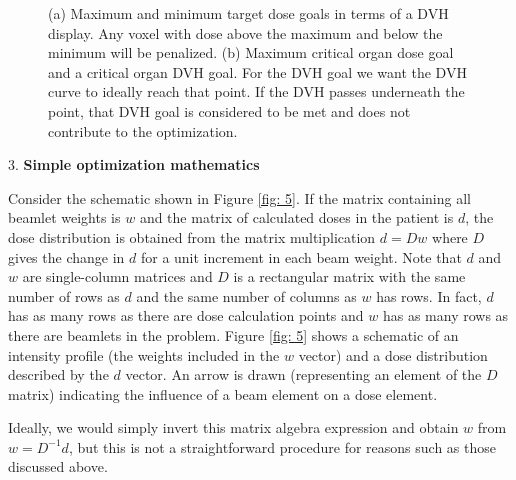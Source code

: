 \begin{figure}[H]
{
    }
    \caption{(a) Maximum and minimum target dose goals in terms of a DVH display. Any voxel with dose above the maximum and below the minimum will be penalized. (b) Maximum critical organ dose goal and a critical organ DVH goal. For the DVH goal we want the DVH curve to ideally reach that point. If the DVH passes underneath the point, that DVH goal is considered to be met and does not contribute to the optimization.}
    \label{fig:dvh_goals}
\end{figure}
3. \textbf{Simple optimization mathematics}

Consider the schematic shown in Figure \ref{fig: 5}. If the matrix containing all beamlet weights is $w$ and the matrix of calculated doses in the patient is $d$, the dose distribution is obtained from the matrix multiplication $d = Dw$ where $D$ gives the change in $d$ for a unit increment in each beam weight. Note that $d$ and $w$ are single-column matrices and $D$ is a rectangular matrix with the same number of rows as $d$ and the same number of columns as $w$ has rows. In fact, $d$ has as many rows as there are dose calculation points and $w$ has as many rows as there are beamlets in the problem. Figure \ref{fig: 5} shows a schematic of an intensity profile (the weights included in the $w$ vector) and a dose distribution described by the $d$ vector. An arrow is drawn (representing an element of the $D$ matrix) indicating the influence of a beam element on a dose element.

Ideally, we would simply invert this matrix algebra expression and obtain $w$ from $w = D^{-1}d$, but this is not a straightforward procedure for reasons such as those discussed above.

